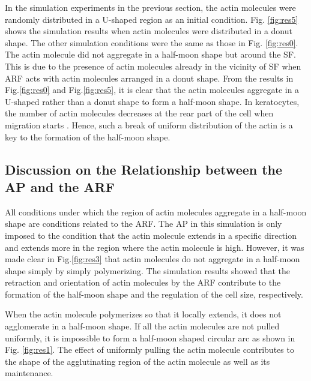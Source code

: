 \documentclass[a4paper,12pt, oneside]{book}
\begin{document}
In the simulation experiments in the previous section, the actin molecules were randomly distributed in a U-shaped region as an initial condition.
Fig. \ref{fig:res5} shows the simulation results when actin molecules were distributed in a donut shape.
The other simulation conditions were the same as those in Fig. \ref{fig:res0}.
The actin molecule did not aggregate in a half-moon shape but around the SF.
This is due to the presence of actin molecules already in the vicinity of SF when ARF acts with actin molecules arranged in a donut shape.
From the results in Fig.\ref{fig:res0} and Fig.\ref{fig:res5}, it is clear that the actin molecules aggregate in a U-shaped rather than a donut shape to form a half-moon shape.
In keratocytes, the number of actin molecules decreases at the rear part of the cell when migration starts \cite{ridley2003cell}.
Hence, such a break of uniform distribution of the actin is a key to the formation of the half-moon shape.  

\subsection{Discussion on the Relationship between the AP and the ARF}
All conditions under which the region of actin molecules aggregate in a half-moon shape are conditions related to the ARF.
The AP in this simulation is only imposed to the condition that the actin molecule extends in a specific direction and extends more in the region where the actin molecule is high.
However, it was made clear in Fig.\ref{fig:res3} that actin molecules do not aggregate in a half-moon shape simply by simply polymerizing.
The simulation results showed that the retraction and orientation of actin molecules by the ARF contribute to the formation of the half-moon shape and the regulation of the cell size, respectively.

When the actin molecule polymerizes so that it locally extends, it does not agglomerate in a half-moon shape.
If all the actin molecules are not pulled uniformly, it is impossible to form a half-moon shaped circular arc as shown in Fig. 
\ref{fig:res1}.
The effect of uniformly pulling the actin molecule contributes to the shape of the agglutinating region of the actin molecule as well as its maintenance.
\end{document}
